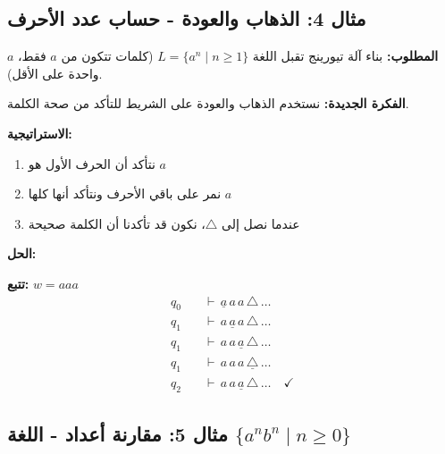\documentclass[14pt]{extarticle}
\begin{document}
\clearpage

\subsection{مثال 4: الذهاب والعودة - حساب عدد الأحرف}

\textbf{المطلوب:} بناء آلة تيورينج تقبل اللغة $L = \{a^n \mid n \geq 1\}$ (كلمات تتكون من $a$ فقط، $a$ واحدة على الأقل).

\textbf{الفكرة الجديدة:} نستخدم الذهاب والعودة على الشريط للتأكد من صحة الكلمة.

\textbf{الاستراتيجية:}
\begin{enumerate}
    \item نتأكد أن الحرف الأول هو $a$
    \item نمر على باقي الأحرف ونتأكد أنها كلها $a$
    \item عندما نصل إلى $\triangle$، نكون قد تأكدنا أن الكلمة صحيحة
\end{enumerate}

\textbf{الحل:}

\begin{center}
\end{center}

\textbf{تتبع:} $w = aaa$
\begin{align*}
q_0 \quad &\vdash \, \underline{a} \, a \, a \, \triangle \, \ldots \\
q_1 \quad &\vdash \, a \, \underline{a} \, a \, \triangle \, \ldots \\
q_1 \quad &\vdash \, a \, a \, \underline{a} \, \triangle \, \ldots \\
q_1 \quad &\vdash \, a \, a \, a \, \underline{\triangle} \, \ldots \\
q_2 \quad &\vdash \, a \, a \, \underline{a} \, \triangle \, \ldots \quad \checkmark
\end{align*}

\clearpage

\subsection{مثال 5: مقارنة أعداد - اللغة $\{a^n b^n \mid n \geq 0\}$}
\end{document}

